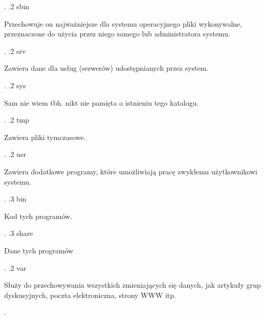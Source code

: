 \documentclass[11pt, a4paper]{article}
\begin{document}
{\begin{minipage}[t]{0.7\textwidth}
            \vspace{\baselineskip}
        \end{minipage}.
        .2 sbin \dotfill \begin{minipage}[t]{0.7\textwidth}
            \textnormal{Przechowuje on najważniejsze dla systemu operacyjnego pliki wykonywalne, przeznaczone do użycia przez niego samego lub administratora systemu.}
            \vspace{\baselineskip}
        \end{minipage}.
        .2 srv \dotfill \begin{minipage}[t]{0.7\textwidth}
            \textnormal{Zawiera dane dla usług (serwerów) udostępnianych przez system.}
            \vspace{\baselineskip}
        \end{minipage}.
        .2 sys \dotfill \begin{minipage}[t]{0.7\textwidth}
            \textnormal{Sam nie wiem tbh. nikt nie pamięta o istnieniu tego katalogu.}
            \vspace{\baselineskip}
        \end{minipage}.
        .2 tmp \dotfill \begin{minipage}[t]{0.7\textwidth}
            \textnormal{Zawiera pliki tymczasowe.}
            \vspace{\baselineskip}
        \end{minipage}.
        .2 usr \dotfill \begin{minipage}[t]{0.7\textwidth}
            \textnormal{Zawiera dodatkowe programy, które umożliwiają pracę zwykłemu użytkownikowi systemu.}
            \vspace{\baselineskip}
        \end{minipage}.
            .3 bin \dotfill \begin{minipage}[t]{0.7\textwidth}
                \textnormal{Kod tych programów.}
                \vspace{\baselineskip}
            \end{minipage}.
            .3 share \dotfill \begin{minipage}[t]{0.7\textwidth}
                \textnormal{Dane tych programów}
                \vspace{\baselineskip}
            \end{minipage}.
        .2 var \dotfill \begin{minipage}[t]{0.7\textwidth}
            \textnormal{Służy do przechowywania wszystkich zmieniających się danych, jak artykuły grup dyskusyjnych, poczta elektroniczna, strony WWW itp.}
            \vspace{\baselineskip}
        \end{minipage}.
}\hfill
\end{document}
